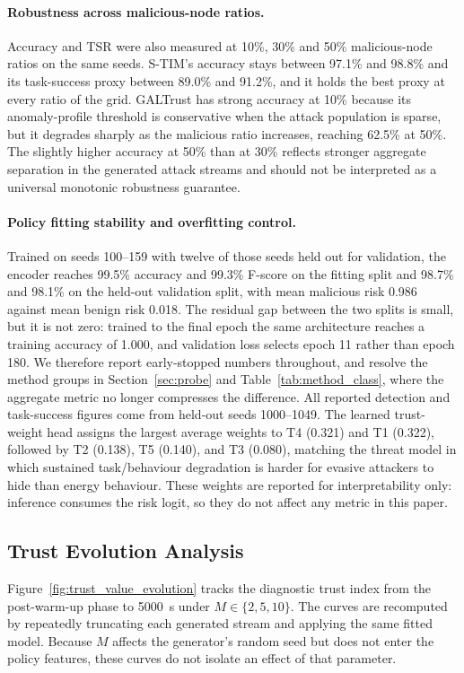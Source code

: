 \documentclass[notspecified,article,submit,moreauthors]{Definitions/mdpi}
\begin{document}
\paragraph{Robustness across malicious-node ratios.}
Accuracy and TSR were also measured at 10\%, 30\% and 50\% malicious-node ratios on the same seeds. S-TIM's accuracy stays between 97.1\% and 98.8\% and its task-success proxy between 89.0\% and 91.2\%, and it holds the best proxy at every ratio of the grid. GALTrust has strong accuracy at 10\% because its anomaly-profile threshold is conservative when the attack population is sparse, but it degrades sharply as the malicious ratio increases, reaching 62.5\% at 50\%. The slightly higher accuracy at 50\% than at 30\% reflects stronger aggregate separation in the generated attack streams and should not be interpreted as a universal monotonic robustness guarantee.

\paragraph{Policy fitting stability and overfitting control.}
Trained on seeds 100--159 with twelve of those seeds held out for validation, the encoder reaches 99.5\% accuracy and 99.3\% F-score on the fitting split and 98.7\% and 98.1\% on the held-out validation split, with mean malicious risk 0.986 against mean benign risk 0.018. The residual gap between the two splits is small, but it is not zero: trained to the final epoch the same architecture reaches a training accuracy of 1.000, and validation loss selects epoch 11 rather than epoch 180. We therefore report early-stopped numbers throughout, and resolve the method groups in Section~\ref{sec:probe} and Table~\ref{tab:method_class}, where the aggregate metric no longer compresses the difference. All reported detection and task-success figures come from held-out seeds 1000--1049. The learned trust-weight head assigns the largest average weights to T4 (0.321) and T1 (0.322), followed by T2 (0.138), T5 (0.140), and T3 (0.080), matching the threat model in which sustained task/behaviour degradation is harder for evasive attackers to hide than energy behaviour. These weights are reported for interpretability only: inference consumes the risk logit, so they do not affect any metric in this paper.

\subsection{Trust Evolution Analysis}
\label{sec:trust_evolution}
Figure~\ref{fig:trust_value_evolution} tracks the diagnostic trust index from the post-warm-up phase to 5000~s under $M \in \{2,5,10\}$. The curves are recomputed by repeatedly truncating each generated stream and applying the same fitted model. Because $M$ affects the generator's random seed but does not enter the policy features, these curves do not isolate an effect of that parameter.
\end{document}
